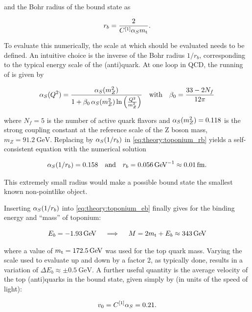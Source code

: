 \noindent and the Bohr radius of the bound state as

\begin{equation}
\label{eq:theory:toponium_rb}
  r_b = \frac{2} {C^{[1]} \alpha_S m_{\mathrm{t}}} .
\end{equation}

To evaluate this numerically, the scale at which \alphas should be evaluated needs to be defined. An intuitive choice is the inverse of the Bohr radius $1/r_b$, corresponding to the typical energy scale of the (anti)quark. At one loop in QCD, the running of \alphas is given by 

\begin{equation}
  \alpha_S (Q^2) = \frac{\alpha_S(m_Z^2)}{ 1 + \beta_0 \, \alpha_S(m_Z^2) \ln \left( \frac{Q^2}{m_Z^2} \right)} \quad \text{with} \quad \beta_0 = \frac{33 - 2 N_f}{12 \pi}
\end{equation}

\noindent where $N_f = 5$ is the number of active quark flavors and $\alpha_S(m_Z^2) = 0.118$ is the strong coupling constant at the reference scale of the Z boson mass, $m_Z = \SI{91.2}{\GeV}$.
Replacing \alphas by $\alpha_S(1/r_b)$ in \cref{eq:theory:toponium_rb} yields a self-consistent equation with the numerical solution

\begin{equation}
  \alphas(1/r_b) = 0.158 \quad \text{and} \quad r_b = \SI{0.056}{\per\GeV} \approx \SI{0.01}{\femto\meter} .
\end{equation}

This extremely small radius would make a possible \ttbar bound state the smallest known non-pointlike object.

Inserting $\alpha_S(1/r_b)$ into \cref{eq:theory:toponium_eb} finally gives for the binding energy and ``mass'' of toponium:

\begin{equation}
  E_b = - \SI{1.93}{\GeV} \quad \implies \quad M = 2 \mt + E_b \approx \SI{343}{\GeV}
\end{equation}

\noindent where a value of $\mt = \SI{172.5}{\GeV}$ was used for the top quark mass. Varying the scale used to evaluate \alphas up and down by a factor 2, as typically done, results in a variation of $\Delta E_b \approx \pm\SI{0.5}{\GeV}$. A further useful quantity is the average velocity of the top (anti)quarks in the bound state, given simply by (in units of the speed of light):

\begin{equation}
  v_0 = C^{[1]} \alpha_S = 0.21 .
\end{equation}

